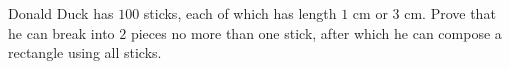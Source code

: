 Donald Duck has $100$ sticks, each of which has length $1$ cm or $3$ cm. Prove that he can break into $2$ pieces no more than one stick, after which he can compose a rectangle using all sticks.

